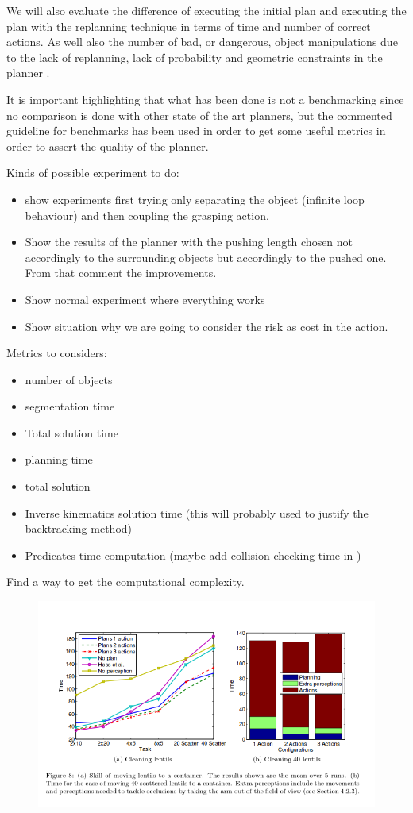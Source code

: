 We will also evaluate the difference of executing the initial plan and executing the plan with the replanning technique in terms of time and number of correct actions. As well also the number of bad, or dangerous, object manipulations due to the lack of replanning, lack of probability and geometric constraints in the planner . 

It is important highlighting that what has been done is not a benchmarking since no comparison is done with other state of the art planners, but the commented guideline for benchmarks has been used in order to get some useful metrics in order to assert the quality of the planner. 

Kinds of possible experiment to do:
\begin{itemize}
\item show experiments first trying only separating the object (infinite loop behaviour) and then coupling the grasping action. 
\item Show the results of the planner with the pushing length chosen not accordingly to the surrounding objects but accordingly to the pushed one. From that comment the improvements.
\item Show normal experiment where everything works
\item Show situation why we are going to consider the risk as cost in the action. 
\end{itemize}

Metrics to considers:
\begin{itemize}
\item number of objects
\item segmentation time
\item Total solution time
\item planning time
\item total solution
\item Inverse kinematics solution time (this will probably used to justify the backtracking method)
\item Predicates time computation (maybe add collision checking time in )
\end{itemize}


Find a way to get the computational complexity. 

\begin{figure}
\centering
\includegraphics[width=\textwidth]{Img/general/experiments.png}
\end{figure}